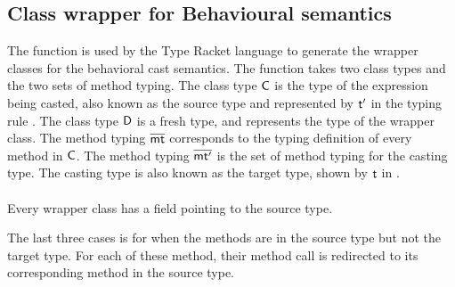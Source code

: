 \documentclass[acmlarge, anonymous, authordraft]{acmart}
\begin{document}
\subsection{Class wrapper for Behavioural semantics}\label{wrap}

The  function is used by the Type Racket language to generate the wrapper classes
for the behavioral cast semantics. The  function takes two class types and the two
sets of method typing. The class type ${\sf{C}}$ is the type of the expression being casted, also known 
as the source type and represented by $\tp$ in the typing rule .
The class type ${\sf{D}}$ is a fresh type, and represents the type of the wrapper class.
The method typing $\overline{{\sf{mt}}}$ corresponds to the typing definition of every method in ${\sf{C}}$.
The method typing $\overline{{\sf{mt'}}}$ is the set of method typing for the casting type. The casting
type is also known as the target type, shown by $\t$ in . \\
 
 \\

Every wrapper class has a  field pointing to the source type.


The last three cases is for when the methods are in the source type but not the 
target type. For each of these method, their method call is redirected 
to its corresponding method in the source type.


\renewcommand{\bscast}[2]{\EM{\BehCast{#1}{{#2}}}}
\end{document}
